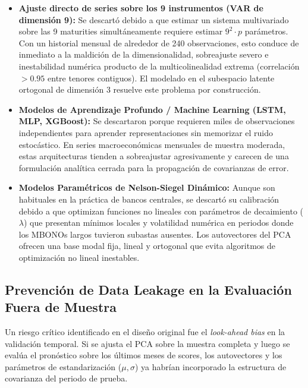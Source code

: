 \documentclass[11pt]{article}
\begin{document}
\begin{itemize}
    \item \textbf{Ajuste directo de series sobre los 9 instrumentos (VAR de dimensión 9):} Se descartó debido a que estimar un sistema multivariado sobre las 9 maturities simultáneamente requiere estimar $9^2 \cdot p$ parámetros. Con un historial mensual de alrededor de 240 observaciones, esto conduce de inmediato a la maldición de la dimensionalidad, sobreajuste severo e inestabilidad numérica producto de la multicolinealidad extrema (correlación $>0.95$ entre tenores contiguos). El modelado en el subespacio latente ortogonal de dimensión 3 resuelve este problema por construcción.
    
    \item \textbf{Modelos de Aprendizaje Profundo / Machine Learning (LSTM, MLP, XGBoost):} Se descartaron porque requieren miles de observaciones independientes para aprender representaciones sin memorizar el ruido estocástico. En series macroeconómicas mensuales de muestra moderada, estas arquitecturas tienden a sobreajustar agresivamente y carecen de una formulación analítica cerrada para la propagación de covarianzas de error.
    
    \item \textbf{Modelos Paramétricos de Nelson-Siegel Dinámico:} Aunque son habituales en la práctica de bancos centrales, se descartó su calibración debido a que optimizan funciones no lineales con parámetros de decaimiento ($\lambda$) que presentan mínimos locales y volatilidad numérica en periodos donde los MBONOs largos tuvieron subastas ausentes. Los autovectores del PCA ofrecen una base modal fija, lineal y ortogonal que evita algoritmos de optimización no lineal inestables.
\end{itemize}

\subsection{Prevención de Data Leakage en la Evaluación Fuera de Muestra}

Un riesgo crítico identificado en el diseño original fue el \textit{look-ahead bias} en la validación temporal. Si se ajusta el PCA sobre la muestra completa y luego se evalúa el pronóstico sobre los últimos meses de scores, los autovectores y los parámetros de estandarización ($\mu, \sigma$) ya habrían incorporado la estructura de covarianza del periodo de prueba.
\end{document}
